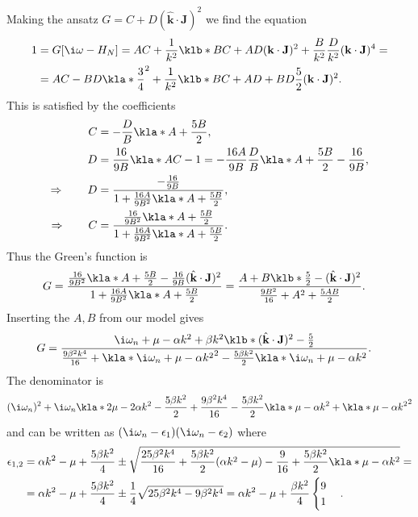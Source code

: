 \documentclass[english, parskip=full]{scrartcl}
\begin{document}
Making the ansatz $G=C+D(\hat{\textbf{k}}\cdot \textbf{J})^2$ we find the equation
\begin{align}
1 &= G[\i\omega - H_N] = AC + \frac{1}{k^2}\klb*{BC + A D}(\textbf{k}\cdot \textbf{J})^2 + \frac{B}{k^2}\frac{D}{k^2} (\textbf{k}\cdot \textbf{J})^4 = \\
&= AC - BD \kla*{\frac{3}{4}}^2 + \frac{1}{k^2}\klb*{BC+AD+BD \frac{5}{2}} (\textbf{k}\cdot \textbf{J})^2.
\end{align}
This is satisfied by the coefficients
\begin{align}
C &= -\frac{D}{B} \kla*{A + \frac{5B}{2}},\\
D &= \frac{16}{9B} \kla*{AC - 1} = -\frac{16A}{9B} \frac{D}{B} \kla*{A + \frac{5B}{2}} - \frac{16}{9B},\\
\Rightarrow\qquad D &= \frac{-\frac{16}{9B}}{1 + \frac{16A}{9B^2} \kla*{A + \frac{5B}{2}}},\\
\Rightarrow\qquad C &= \frac{\frac{16}{9B^2} \kla*{A + \frac{5B}{2}}}{1 + \frac{16A}{9B^2} \kla*{A + \frac{5B}{2}}}.
\end{align}
Thus the Green's function is
\begin{align}
G &= \frac{\frac{16}{9B^2} \kla*{A + \frac{5B}{2}} - \frac{16}{9B} (\hat{\textbf{k}}\cdot \textbf{J})^2}{1 + \frac{16A}{9B^2} \kla*{A + \frac{5B}{2}}} = \frac{A + B\klb*{\frac{5}{2} - (\hat{\textbf{k}}\cdot \textbf{J})^2}}{\frac{9B^2}{16} + A^2 + \frac{5AB}{2}}.
\end{align}
Inserting the $A,B$ from our model gives
\begin{align}
G &= \frac{\i\omega_n+\mu -\alpha k^2 + \beta k^2 \klb*{ (\hat{\textbf{k}}\cdot \textbf{J})^2 - \frac{5}{2}}}{\frac{9\beta^2k^4}{16} + \kla*{\i\omega_n + \mu - \alpha k^2}^2 - \frac{5\beta k^2}{2} \kla*{\i\omega_n + \mu - \alpha k^2} }.
\end{align}
The denominator is
\begin{align}
(\i\omega_n)^2 + \i\omega_n \kla*{2\mu - 2\alpha k^2 - \frac{5\beta k^2}{2}} + \frac{9\beta^2k^4}{16} - \frac{5\beta k^2}{2} \kla*{\mu - \alpha k^2} + \kla*{\mu - \alpha k^2}^2
\end{align}
and can be written as $(\i\omega_n - \epsilon_1) (\i\omega_n - \epsilon_2)$ where
\begin{align}
\epsilon_{1,2} &= \alpha k^2 - \mu + \frac{5\beta k^2}{4} \pm \sqrt{  \frac{25\beta^2k^4}{16} + \frac{5\beta k^2}{2} (\alpha k^2 - \mu) - \frac{9}{16} + \frac{5\beta k^2}{2} \kla*{\mu - \alpha k^2}} = \\
&= \alpha k^2 - \mu + \frac{5\beta k^2}{4} \pm \frac{1}{4} \sqrt{25\beta^2 k^4 - 9\beta^2k^4} = \alpha k^2 - \mu + \frac{\beta k^2}{4}\begin{cases} 9 \\ 1  \end{cases}.
\end{align}
\end{document}
